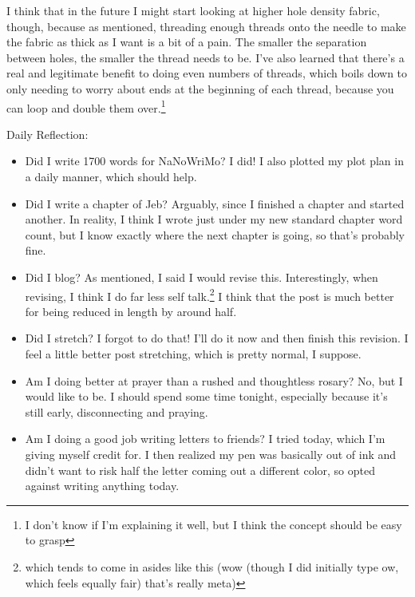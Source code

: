\documentclass[12pt]{article}[titlepage]
\newcommand{\1}{\={a}}
\newcommand{\2}{\={e}}
\newcommand{\3}{\={\i}}
\newcommand{\4}{\=o}
\newcommand{\5}{\=u}
\newcommand{\6}{\={A}}
\renewcommand{\,}{\textsuperscript{,}}
\begin{document}
I think that in the future I might start looking at higher hole density fabric, though, because as mentioned, threading enough threads onto the needle to make the fabric as thick as I want is a bit of a pain.
The smaller the separation between holes, the smaller the thread needs to be.
I've also learned that there's a real and legitimate benefit to doing even numbers of threads, which boils down to only needing to worry about ends at the beginning of each thread, because you can loop and double them over.\footnote{I don't know if I'm explaining it well, but I think the concept should be easy to grasp}


Daily Reflection:
\begin{itemize}
\item Did I write 1700 words for NaNoWriMo?
I did! I also plotted my plot plan in a daily manner, which should help.
\item Did I write a chapter of Jeb?
Arguably, since I finished a chapter and started another.
In reality, I think I wrote just under my new standard chapter word count, but I know exactly where the next chapter is going, so that's probably fine.
\item Did I blog? As mentioned, I said I would revise this. Interestingly, when revising, I think I do far less self talk.\footnote{which tends to come in asides like this (wow (though I did initially type ow, which feels equally fair) that's really meta)}
I think that the post is much better for being reduced in length by around half.
\item Did I stretch? I forgot to do that! I'll do it now and then finish this revision.
I feel a little better post stretching, which is pretty normal, I suppose.
\item Am I doing better at prayer than a rushed and thoughtless rosary? No, but I would like to be.
I should spend some time tonight, especially because it's still early, disconnecting and praying.
\item Am I doing a good job writing letters to friends?
I tried today, which I'm giving myself credit for.
I then realized my pen was basically out of ink and didn't want to risk half the letter coming out a different color, so opted against writing anything today.
\end{itemize}
\end{document}
